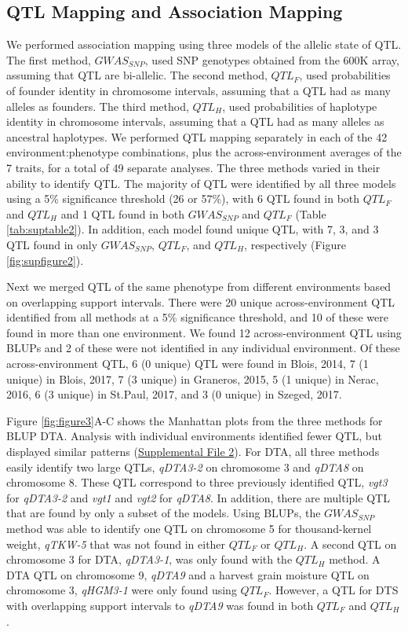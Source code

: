 \documentclass[9pt,twocolumn,twoside]{gsag3jnl}
\begin{document}
\subsection{QTL Mapping and Association Mapping}
We performed association mapping using three models of the allelic state of QTL.
The first method, $GWAS_{SNP}$, used SNP genotypes obtained from the 600K array, assuming that QTL are bi-allelic.
The second method, $QTL_F$, used probabilities of founder identity in chromosome intervals, assuming that a QTL had as many alleles as founders.
The third method, $QTL_H$, used probabilities of haplotype identity in chromosome intervals, assuming that a QTL had as many alleles as ancestral haplotypes.
We performed QTL mapping separately in each of the 42 environment:phenotype combinations, plus the across-environment averages of the 7 traits, for a total of 49 separate analyses.
The three methods varied in their ability to identify QTL.
The majority of QTL were identified by all three models using a 5\% significance threshold (26 or 57\%), with 6 QTL found in both $QTL_F$ and $QTL_H$ and 1 QTL found in both $GWAS_{SNP}$ and $QTL_F$ (Table \ref{tab:suptable2}).
In addition, each model found unique QTL, with 7, 3, and 3 QTL found in only $GWAS_{SNP}$, $QTL_F$, and $QTL_H$, respectively (Figure \ref{fig:supfigure2}).

Next we merged QTL of the same phenotype from different environments based on overlapping support intervals.
There were 20 unique across-environment QTL identified from all methods at a 5\% significance threshold, and 10 of these  were found in more than one environment.
We found 12 across-environment QTL  using BLUPs and 2 of these were not identified in any individual environment.
Of these across-environment QTL, 6 (0 unique) QTL were found in Blois, 2014, 7 (1 unique) in Blois, 2017, 7 (3 unique) in Graneros, 2015, 5 (1 unique) in Nerac, 2016, 6 (3 unique) in St.Paul, 2017, and 3 (0 unique) in Szeged, 2017.

Figure \ref{fig:figure3}A-C shows the Manhattan plots from the three methods for BLUP DTA.
Analysis with individual environments identified fewer QTL, but displayed similar patterns (\href{run:./figures/Methods_Supplemental2.pdf}{Supplemental File 2}).
For DTA, all three methods easily identify two large QTLs, \emph{qDTA3-2} on chromosome 3 and \emph{qDTA8} on chromosome 8.
These QTL correspond to three previously identified QTL, \emph{vgt3} for \emph{qDTA3-2} and \emph{vgt1} and \emph{vgt2} for \emph{qDTA8}.
In addition, there are multiple QTL that are found by only a subset of the models.
Using BLUPs, the $GWAS_{SNP}$ method was able to identify one QTL on chromosome 5 for thousand-kernel weight, \emph{qTKW-5} that was not found in either $QTL_F$ or $QTL_H$.
A second QTL on chromosome 3 for DTA, \emph{qDTA3-1}, was only found with the $QTL_H$ method.
A DTA QTL on chromosome 9, \emph{qDTA9} and a harvest grain moisture QTL on chromosome 3, \emph{qHGM3-1} were only found using $QTL_F$.
However, a QTL for DTS with overlapping support intervals to \emph{qDTA9} was found in both $QTL_F$ and $QTL_H$.
\end{document}
